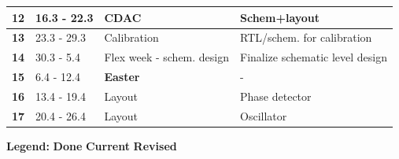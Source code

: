 \documentclass[t, screen, aspectratio=43]{beamer}
\begin{document}
\begin{frame}
\begin{table}[htb!]
\begin{tabular}{|c|l|l|l|}
			\hline 
			\rule[-1ex]{0pt}{2.5ex}\textbf{12}&16.3 - 22.3& CDAC  & Schem+layout\\ 
			\hline 
			\rule[-1ex]{0pt}{2.5ex}\textbf{13}&23.3 - 29.3& Calibration& RTL/schem. for calibration\\ 
			\hline 
			\rule[-1ex]{0pt}{2.5ex}\textbf{14}& 30.3 - 5.4 &  Flex week - schem. design & Finalize schematic level design\\ 
			\hline 
			\rule[-1ex]{0pt}{2.5ex}\textbf{15}& 6.4 - 12.4& {\color{red}\textbf{Easter}} & - \\ 
			\hline 
			\rule[-1ex]{0pt}{2.5ex}\textbf{16}& 13.4 - 19.4& Layout & Phase detector\\ 
			\hline 
			\rule[-1ex]{0pt}{2.5ex}\textbf{17}& 20.4 - 26.4& Layout & Oscillator\\ 
			\hline 
		\end{tabular}
		\begin{flushleft}\textbf{Legend:} \colorbox{red!20}{\textbf{Done}} \colorbox{green!20}{\textbf{Current}}  \colorbox{blue!20}{\textbf{Revised}}
		\end{flushleft}
	\end{table}   
\end{frame}
\end{document}
